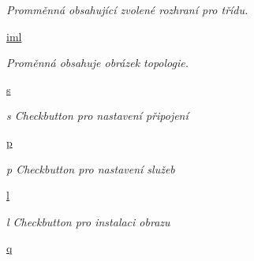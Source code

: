 \begin{DoxyCompactItemize}
\begin{DoxyCompactList}\small\item\em Promměnná obsahující zvolené rozhraní pro třídu. \end{DoxyCompactList}\item 
\hypertarget{classcloseSetup_1_1App_a1f906c533c8fd3e9352eed11b43b86d9}{\hyperlink{classcloseSetup_1_1App_a1f906c533c8fd3e9352eed11b43b86d9}{iml}}\label{df/df9/classcloseSetup_1_1App_a1f906c533c8fd3e9352eed11b43b86d9}

\begin{DoxyCompactList}\small\item\em Proměnná obsahuje obrázek topologie. \end{DoxyCompactList}\item 
\hypertarget{classcloseSetup_1_1App_a9762b9f2129fd5df0bd4e67c71dd9e9a}{\hyperlink{classcloseSetup_1_1App_a9762b9f2129fd5df0bd4e67c71dd9e9a}{s}}\label{df/df9/classcloseSetup_1_1App_a9762b9f2129fd5df0bd4e67c71dd9e9a}

\begin{DoxyCompactList}\small\item\em s Checkbutton pro nastavení připojení \end{DoxyCompactList}\item 
\hypertarget{classcloseSetup_1_1App_a637c65466089e313883e58ba012c4d4b}{\hyperlink{classcloseSetup_1_1App_a637c65466089e313883e58ba012c4d4b}{p}}\label{df/df9/classcloseSetup_1_1App_a637c65466089e313883e58ba012c4d4b}

\begin{DoxyCompactList}\small\item\em p Checkbutton pro nastavení služeb \end{DoxyCompactList}\item 
\hypertarget{classcloseSetup_1_1App_a7ae7fb08de3a6ce4aa2feeb992ac6d7c}{\hyperlink{classcloseSetup_1_1App_a7ae7fb08de3a6ce4aa2feeb992ac6d7c}{l}}\label{df/df9/classcloseSetup_1_1App_a7ae7fb08de3a6ce4aa2feeb992ac6d7c}

\begin{DoxyCompactList}\small\item\em l Checkbutton pro instalaci obrazu \end{DoxyCompactList}\item 
\hypertarget{classcloseSetup_1_1App_a71dcf82d61ce8d8315cb11946529678d}{\hyperlink{classcloseSetup_1_1App_a71dcf82d61ce8d8315cb11946529678d}{q}}\label{df/df9/classcloseSetup_1_1App_a71dcf82d61ce8d8315cb11946529678d}


\end{DoxyCompactItemize}
